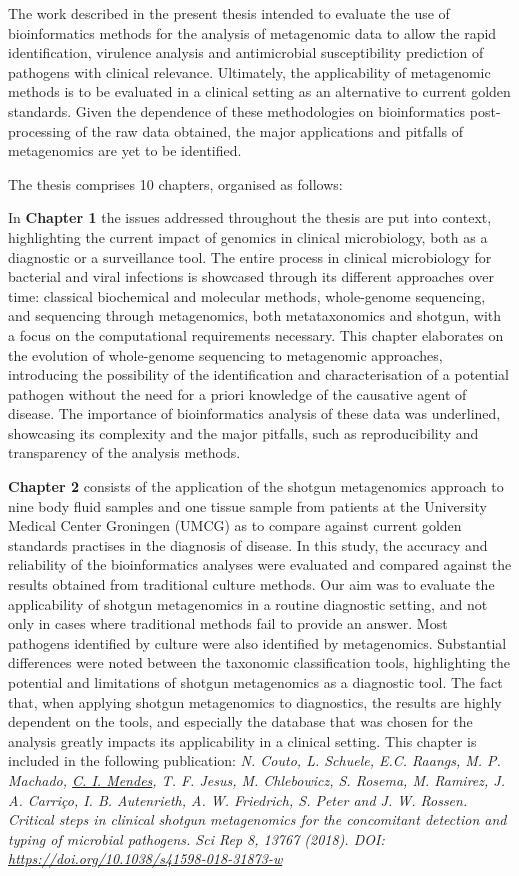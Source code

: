 The work described in the present thesis intended to evaluate the use of bioinformatics methods for the analysis of metagenomic data to allow the rapid identification, virulence analysis and antimicrobial susceptibility prediction of pathogens with clinical relevance. Ultimately, the applicability of metagenomic methods is to be evaluated in a clinical setting as an alternative to current golden standards. Given the dependence of these methodologies on bioinformatics post-processing of the raw data obtained, the major applications and pitfalls of metagenomics are yet to be identified. 

The thesis comprises 10 chapters, organised as follows:

In \textbf{Chapter 1} the issues addressed throughout the thesis are put into context, highlighting the current impact of genomics in clinical microbiology, both as a diagnostic or a surveillance tool. The entire process in clinical microbiology for bacterial and viral infections is showcased through its different approaches over time: classical biochemical and molecular methods, whole-genome sequencing, and sequencing through metagenomics, both metataxonomics and shotgun, with a focus on the computational requirements necessary. This chapter elaborates on the evolution of whole-genome sequencing to metagenomic approaches, introducing the possibility of the identification and characterisation of a potential pathogen without the need for a priori knowledge of the causative agent of disease. The importance of bioinformatics analysis of these data was underlined, showcasing its complexity and the major pitfalls, such as reproducibility and transparency of the analysis methods.   

\textbf{Chapter 2} consists of the application of the shotgun metagenomics approach to nine body fluid samples and one tissue sample from patients at the University Medical Center Groningen (UMCG) as to compare against current golden standards practises in the diagnosis of disease. In this study, the accuracy and reliability of the bioinformatics analyses were evaluated and compared against the results obtained from traditional culture methods. Our aim was to evaluate the applicability of shotgun metagenomics in a routine diagnostic setting, and not only in cases where traditional methods fail to provide an answer. Most pathogens identified by culture were also identified by metagenomics. Substantial differences were noted between the taxonomic classification tools, highlighting the potential and limitations of shotgun metagenomics as a diagnostic tool. The fact that, when applying shotgun metagenomics to diagnostics, the results are highly dependent on the tools, and especially the database that was chosen for the analysis greatly impacts its applicability in a clinical setting. This chapter is included in the following publication:\textit{ N. Couto, L. Schuele, E.C. Raangs, M. P. Machado, \underline{C. I. Mendes}, T. F. Jesus, M. Chlebowicz,  S. Rosema, M. Ramirez, J. A. Carriço, I. B. Autenrieth, A. W. Friedrich, S. Peter and J. W. Rossen. Critical steps in clinical shotgun metagenomics for the concomitant detection and typing of microbial pathogens. Sci Rep 8, 13767 (2018). DOI: \url{https://doi.org/10.1038/s41598-018-31873-w}}

